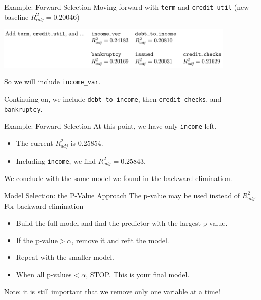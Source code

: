 \begin{frame}{Example: Forward Selection}
    Moving forward with \texttt{term} and \texttt{credit\_util} (new baseline $R^2_{adj}=0.20046$)
    \begin{center}
        \includegraphics[width=4.5in]{images/forw3.png}
    \end{center}
    So we will include \texttt{income\_var}.
    
    \vspace{12pt}Continuing on, we include \texttt{debt\_to\_income}, then \texttt{credit\_checks}, and \texttt{bankruptcy}.
\end{frame}

\begin{frame}{Example: Forward Selection}
    At this point, we have only \texttt{income} left.
    \begin{itemize}
        \item The current $R^2_{adj}$ is 0.25854.
        \item Including \texttt{income}, we find $R^2_{adj}=0.25843$.
    \end{itemize}
    We conclude with the same model we found in the backward elimination.
\end{frame}

\begin{frame}{Model Selection: the P-Value Approach}
    The p-value may be used instead of $R^2_{adj}$. For backward elimination
    \begin{itemize}
        \item Build the full model and find the predictor with the largest p-value.
        \item If the p-value$> \alpha$, remove it and refit the model. 
        \item Repeat with the smaller model.
        \item When all p-values$< \alpha$, STOP. This is your final model.
    \end{itemize}
    Note: it is still important that we remove only one variable at a time!
\end{frame}

